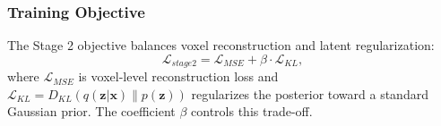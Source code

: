 \subsubsection{Training Objective}

The Stage 2 objective balances voxel reconstruction and latent regularization:
\begin{equation}
  \mathcal{L}_{stage2} = \mathcal{L}_{MSE} + \beta \cdot \mathcal{L}_{KL},
\end{equation}
where $\mathcal{L}_{MSE}$ is voxel-level reconstruction loss and
$\mathcal{L}_{KL} = D_{KL}(q(\mathbf{z}|\mathbf{x}) \| p(\mathbf{z}))$ regularizes the posterior toward a standard Gaussian prior. The coefficient $\beta$ controls this trade-off.


